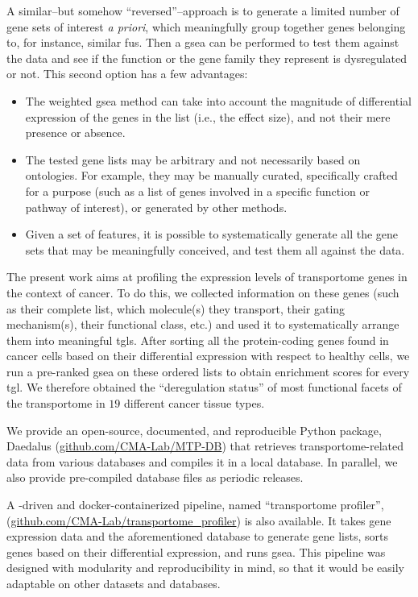 A similar--but somehow ``reversed''--approach is to generate a limited number of gene sets of interest \textit{a priori}, which meaningfully group together genes belonging to, for instance, similar \glspl{fu}.
Then a \gls{gsea} can be performed to test them against the data and see if the function or the gene family they represent is dysregulated or not.
This second option has a few advantages:
\begin{itemize}
    \item The weighted \gls{gsea} method can take into account the magnitude of differential expression of the genes in the list (i.e., the effect size), and not their mere presence or absence.
    \item The tested gene lists may be arbitrary and not necessarily based on ontologies.
    For example, they may be manually curated, specifically crafted for a purpose (such as a list of genes involved in a specific function or pathway of interest), or generated by other methods.
    \item Given a set of features, it is possible to systematically generate all the gene sets that may be meaningfully conceived, and test them all against the data.
\end{itemize}

The present work aims at profiling the expression levels of transportome genes in the context of cancer.
To do this, we collected information on these genes (such as their complete list, which molecule(s) they transport, their gating mechanism(s), their functional class, etc.) and used it to systematically arrange them into meaningful \glspl{tgl}. %
After sorting all the protein-coding genes found in cancer cells based on their differential expression with respect to healthy cells, we run a pre-ranked \gls{gsea} on these ordered lists to obtain enrichment scores for every \gls{tgl}.
We therefore obtained the ``deregulation status'' of most functional facets of the transportome in $19$ different cancer tissue types.

We provide an open-source, documented, and reproducible Python package, Daedalus (\href{https://github.com/CMA-Lab/MTP-DB}{github.com/CMA-Lab/MTP-DB}) that retrieves transportome-related data from various databases and compiles it in a local  database.
In parallel, we also provide pre-compiled database files as periodic releases.

A -driven and docker-containerized pipeline, named ``transportome profiler'', (\href{https://github.com/CMA-Lab/transportome_profiler}{github.com/CMA-Lab/transportome\_profiler}) is also available.
It takes gene expression data and the aforementioned database to generate gene lists, sorts genes based on their differential expression, and runs \gls{gsea}.
This pipeline was designed with modularity and reproducibility in mind, so that it would be easily adaptable on other datasets and databases.
